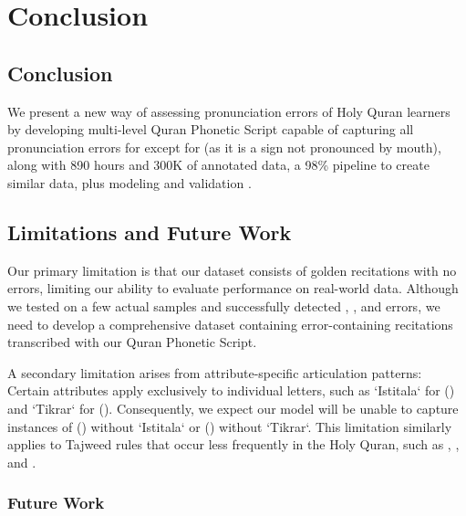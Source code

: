 
\chapter{Conclusion} %

\label{Chapter7} %


\section*{Conclusion}

We present a new way of assessing pronunciation errors of Holy Quran learners by developing multi-level Quran Phonetic Script capable of capturing all pronunciation errors for  except for  (as it is a sign not pronounced by mouth), along with 890 hours and 300K of annotated data, a 98\% pipeline to create similar data, plus modeling and validation \cite{citation}.


\section{Limitations and Future Work}

Our primary limitation is that our dataset consists of golden recitations with no errors, limiting our ability to evaluate performance on real-world data. Although we tested on a few actual samples and successfully detected , , and  errors, we need to develop a comprehensive dataset containing error-containing recitations transcribed with our Quran Phonetic Script.

A secondary limitation arises from attribute-specific articulation patterns: Certain attributes apply exclusively to individual letters, such as `Istitala` for () and `Tikrar` for (). Consequently, we expect our model will be unable to capture instances of () without `Istitala` or () without `Tikrar`. This limitation similarly applies to Tajweed rules that occur less frequently in the Holy Quran, such as , , and .

\subsection{Future Work}

